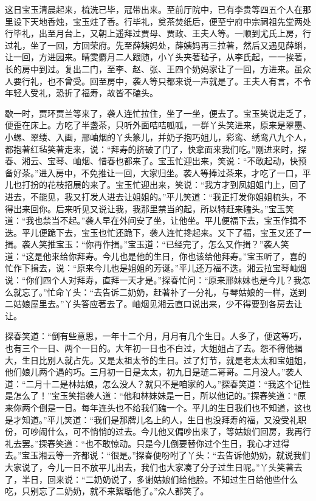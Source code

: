 \begin{parag}
    这日宝玉清晨起来，梳洗已毕，冠带出来。至前厅院中，已有李贵等四五个人在那里设下天地香烛，宝玉炷了香。行毕礼，奠茶焚纸后，便至宁府中宗祠祖先堂两处行毕礼，出至月台上，又朝上遥拜过贾母、贾政、王夫人等。一顺到尤氏上房，行过礼，坐了一回，方回荣府。先至薛姨妈处，薛姨妈再三拉著，然后又遇见薛蝌，让一回，方进园来。晴雯麝月二人跟随，小丫头夹著毡子，从李氏起，一一挨著，长的房中到过。复出二门，至李、赵、张、王四个奶妈家让了一回，方进来。虽众人要行礼，也不曾受。回至房中，袭人等只都来说一声就是了。王夫人有言，不令年轻人受礼，恐折了福寿，故皆不磕头。
\end{parag}


\begin{parag}
    歇一时，贾环贾兰等来了，袭人连忙拉住，坐了一坐，便去了。宝玉笑说走乏了，便歪在床上。方吃了半盏茶，只听外面咭咭呱呱，一群丫头笑进来，原来是翠墨、小螺、翠缕、入画，邢岫烟的丫头篆儿，并奶子抱巧姐儿，彩鸾、绣鸾八九个人，都抱著红毡笑著走来，说：“拜寿的挤破了门了，快拿面来我们吃。”刚进来时，探春、湘云、宝琴、岫烟、惜春也都来了。宝玉忙迎出来，笑说：“不敢起动，快预备好茶。”进入房中，不免推让一回，大家归坐。袭人等捧过茶来，才吃了一口，平儿也打扮的花枝招展的来了。宝玉忙迎出来，笑说：“我方才到凤姐姐门上，回了进去，不能见，我又打发人进去让姐姐的。”平儿笑道：“我正打发你姐姐梳头，不得出来回你。后来听见又说让我，我那里禁当的起，所以特赶来磕头。”宝玉笑道：“我也禁当不起。”袭人早在外间安了坐，让他坐。平儿便福下去，宝玉作揖不迭。平儿便跪下去，宝玉也忙还跪下，袭人连忙搀起来。又下了福，宝玉又还了一揖。袭人笑推宝玉：“你再作揖。”宝玉道：“已经完了，怎么又作揖？”袭人笑道：“这是他来给你拜寿。今儿也是他的生日，你也该给他拜寿。”宝玉听了，喜的忙作下揖去，说：“原来今儿也是姐姐的芳诞。”平儿还万福不迭。湘云拉宝琴岫烟说：“你们四个人对拜寿，直拜一天才是。”探春忙问：“原来邢妹妹也是今儿？我怎么就忘了。”忙命丫头：“去告诉二奶奶，赶著补了一分礼，与琴姑娘的一样，送到二姑娘屋里去。”丫头答应著去了。岫烟见湘云直口说出来，少不得要到各房去让让。
\end{parag}


\begin{parag}
    探春笑道：“倒有些意思，一年十二个月，月月有几个生日。人多了，便这等巧，也有三个一日、两个一日的。大年初一日也不白过，大姐姐占了去。怨不得他福大，生日比别人就占先。又是太祖太爷的生日。过了灯节，就是老太太和宝姐姐，他们娘儿两个遇的巧。三月初一日是太太，初九日是琏二哥哥。二月没人。”袭人道：“二月十二是林姑娘，怎么没人？就只不是咱家的人。”探春笑道：“我这个记性是怎么了！”宝玉笑指袭人道：“他和林妹妹是一日，所以他记的。”探春笑道：“原来你两个倒是一日。每年连头也不给我们磕一个。平儿的生日我们也不知道，这也是才知道。”平儿笑道：“我们是那牌儿名上的人，生日也没拜寿的福，又没受礼职份，可吵闹什么，可不悄悄的过去。今儿他又偏吵出来了，等姑娘们回房，我再行礼去罢。”探春笑道：“也不敢惊动。只是今儿倒要替你过个生日，我心才过得去。”宝玉湘云等一齐都说：“很是。”探春便吩咐了丫头：“去告诉他奶奶，就说我们大家说了，今儿一日不放平儿出去，我们也大家凑了分子过生日呢。”丫头笑著去了，半日，回来说：“二奶奶说了，多谢姑娘们给他脸。不知过生日给他些什么吃，只别忘了二奶奶，就不来絮聒他了。”众人都笑了。
\end{parag}


